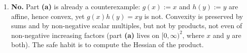 \begin{exercisesolution}
\begin{enumerate}[label=\textbf{(\alph*)}]
    Note that the \emph{main} diagonal would not have exposed this: from $(0,0)$ to $(\pi,\pi)$
    the midpoint value $0$ sits below the average $1$, consistent with convexity. Choosing the
    direction well is most of the work in these problems, and the indefinite Hessian tells you
    which direction to choose, namely an eigenvector for the negative eigenvalue, here $(1,-1)$.
  \item \textbf{No.} Part \textbf{(a)} is already a counterexample: $g(x) := x$ and
    $h(y) := y$ are affine, hence convex, yet $g(x)h(y) = xy$ is not. Convexity is preserved by
    sums and by non-negative scalar multiples, but not by products, not even of non-negative
    increasing factors (part \textbf{(a)} lives on $[0,\infty)^2$, where $x$ and $y$ are both).
    The safe habit is to compute the Hessian of the product.
\end{enumerate}
\end{exercisesolution}
